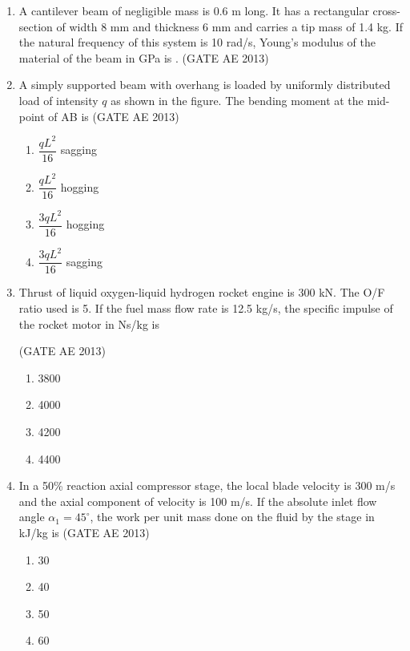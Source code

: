 \documentclass[journal,12pt,onecolumn]{IEEEtran}
\theoremstyle{remark}
\begin{document}
\begin{flushleft}
\begin{enumerate}
\item A cantilever beam of negligible mass is 0.6 m long. It has a rectangular cross-section of width 8 mm and thickness 6 mm and carries a tip mass of 1.4 kg. If the natural frequency of this system is 10 rad/s, Young's modulus of the material of the beam in GPa is \underline{\hspace{2cm}}. \hfill(GATE AE 2013)

\item A simply supported beam with overhang is loaded by uniformly distributed load of intensity $q$ as shown in the figure. The bending moment at the mid-point of AB is \hfill(GATE AE 2013)
\begin{multicols}{2}
\begin{enumerate}
\item $\dfrac{qL^2}{16}$ sagging
\item $\dfrac{qL^2}{16}$ hogging
\item $\dfrac{3qL^2}{16}$ hogging
\item $\dfrac{3qL^2}{16}$ sagging
\end{enumerate}
\end{multicols}

\item Thrust of liquid oxygen-liquid hydrogen rocket engine is 300 kN. The O/F ratio used is 5. If the fuel mass flow rate is 12.5 kg/s, the specific impulse of the rocket motor in Ns/kg is

\hfill(GATE AE 2013)
\begin{multicols}{2}
\begin{enumerate}
\item 3800
\item 4000
\item 4200
\item 4400
\end{enumerate}
\end{multicols}

\item In a 50\% reaction axial compressor stage, the local blade velocity is 300 m/s and the axial component of velocity is 100 m/s. If the absolute inlet flow angle $\alpha_1 = 45^\circ$, the work per unit mass done on the fluid by the stage in kJ/kg is \hfill(GATE AE 2013)
\begin{multicols}{2}
\begin{enumerate}
\item 30
\item 40
\item 50
\item 60
\end{enumerate}
\end{multicols}


\end{enumerate}
\end{flushleft}
\end{document}
